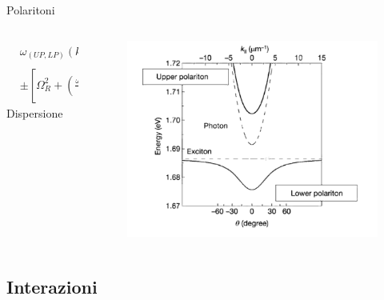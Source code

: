 \begin{frame}{Polaritoni}
\begin{minipage}{\textwidth}
\begin{columns}
{\begin{column}{.45\textwidth}
   \begin{equation*}
    \begin{align}
      &\displaystyle\omega_{ {\scriptstyle (UP,LP)} } (k) = \frac{\omega_C (k) + \omega_X (k)}{2} \\
                             &\pm \left[\Omega_R^2 + \left(\frac{\omega_C (k) - \omega_X (k)}{2}\right)^2\right]^{1/2}
    \end{align}
   \end{equation*}
   Dispersione
    \end{column}
  }
  \hfill
  \begin{column}{.55\textwidth}
   \begin{figure}[h]
    \includegraphics[scale=.2]{pics/polariton_dispersion.png}
   \end{figure}

  \end{column}
\end{columns}
\end{minipage}

\end{frame}



\subsection{Interazioni}

